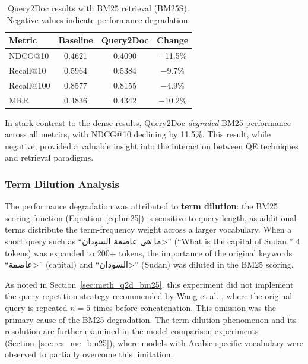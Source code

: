 \begin{table}[htbp]
    \centering
    \caption[Query2Doc results with BM25 retrieval]{Query2Doc results with BM25 retrieval (BM25S). Negative values indicate performance degradation.}
    \label{tab:q2d_bm25}
    \begin{tabular}{@{}lccc@{}}
        \toprule
        \textbf{Metric} & \textbf{Baseline} & \textbf{Query2Doc} & \textbf{Change} \\
        \midrule
        NDCG@10 & 0.4621 & 0.4090 & $-$11.5\% \\
        Recall@10 & 0.5964 & 0.5384 & $-$9.7\% \\
        Recall@100 & 0.8577 & 0.8155 & $-$4.9\% \\
        MRR & 0.4836 & 0.4342 & $-$10.2\% \\
        \bottomrule
    \end{tabular}
\end{table}

In stark contrast to the dense results, Query2Doc \emph{degraded} BM25 performance across all metrics, with NDCG@10 declining by 11.5\%. This result, while negative, provided a valuable insight into the interaction between QE techniques and retrieval paradigms.

\subsubsection{Term Dilution Analysis}
\label{sec:res_term_dilution}

The performance degradation was attributed to \textbf{term dilution}: the BM25 scoring function (Equation~\ref{eq:bm25}) is sensitive to query length, as additional terms distribute the term-frequency weight across a larger vocabulary. When a short query such as ``\<ما هي عاصمة السودان>'' (``What is the capital of Sudan,'' 4 tokens) was expanded to 200+ tokens, the importance of the original keywords ``\<عاصمة>'' (capital) and ``\<السودان>'' (Sudan) was diluted in the BM25 scoring.

As noted in Section~\ref{sec:meth_q2d_bm25}, this experiment did not implement the query repetition strategy recommended by Wang et al. \cite{wang_2023_query2doc}, where the original query is repeated $n=5$ times before concatenation. This omission was the primary cause of the BM25 degradation. The term dilution phenomenon and its resolution are further examined in the model comparison experiments (Section~\ref{sec:res_mc_bm25}), where models with Arabic-specific vocabulary were observed to partially overcome this limitation.

